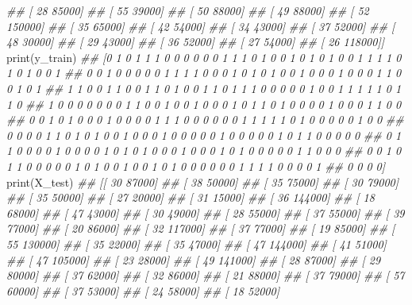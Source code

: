 \documentclass[
]{book}
\newenvironment{Shaded}{\begin{snugshade}}{\end{snugshade}}
\newcommand{\BuiltInTok}[1]{#1}
\newcommand{\CommentTok}[1]{\textcolor[rgb]{0.56,0.35,0.01}{\textit{#1}}}
\newcommand{\NormalTok}[1]{#1}
\theoremstyle{definition}
\theoremstyle{definition}
\theoremstyle{definition}
\theoremstyle{definition}
\theoremstyle{remark}
\begin{document}
\begin{Shaded}
\begin{Highlighting}[]
\CommentTok{\#\#  [    28  85000]}
\CommentTok{\#\#  [    55  39000]}
\CommentTok{\#\#  [    50  88000]}
\CommentTok{\#\#  [    49  88000]}
\CommentTok{\#\#  [    52 150000]}
\CommentTok{\#\#  [    35  65000]}
\CommentTok{\#\#  [    42  54000]}
\CommentTok{\#\#  [    34  43000]}
\CommentTok{\#\#  [    37  52000]}
\CommentTok{\#\#  [    48  30000]}
\CommentTok{\#\#  [    29  43000]}
\CommentTok{\#\#  [    36  52000]}
\CommentTok{\#\#  [    27  54000]}
\CommentTok{\#\#  [    26 118000]]}
\BuiltInTok{print}\NormalTok{(y\_train)}
\CommentTok{\#\# [0 1 0 1 1 1 0 0 0 0 0 0 1 1 1 0 1 0 0 1 0 1 0 1 0 0 1 1 1 1 0 1 0 1 0 0 1}
\CommentTok{\#\#  0 0 1 0 0 0 0 0 1 1 1 1 0 0 0 1 0 1 0 1 0 0 1 0 0 0 1 0 0 0 1 1 0 0 1 0 1}
\CommentTok{\#\#  1 1 0 0 1 1 0 0 1 1 0 1 0 0 1 1 0 1 1 1 0 0 0 0 0 1 0 0 1 1 1 1 1 0 1 1 0}
\CommentTok{\#\#  1 0 0 0 0 0 0 0 1 1 0 0 1 0 0 1 0 0 0 1 0 1 1 0 1 0 0 0 0 1 0 0 0 1 1 0 0}
\CommentTok{\#\#  0 0 1 0 1 0 0 0 1 0 0 0 0 1 1 1 0 0 0 0 0 0 1 1 1 1 1 0 1 0 0 0 0 0 1 0 0}
\CommentTok{\#\#  0 0 0 0 1 1 0 1 0 1 0 0 1 0 0 0 1 0 0 0 0 0 1 0 0 0 0 0 1 0 1 1 0 0 0 0 0}
\CommentTok{\#\#  0 1 1 0 0 0 0 1 0 0 0 0 1 0 1 0 1 0 0 0 1 0 0 0 1 0 1 0 0 0 0 0 1 1 0 0 0}
\CommentTok{\#\#  0 0 1 0 1 1 0 0 0 0 0 1 0 1 0 0 1 0 0 1 0 1 0 0 0 0 0 0 1 1 1 1 0 0 0 0 1}
\CommentTok{\#\#  0 0 0 0]}
\BuiltInTok{print}\NormalTok{(X\_test)}
\CommentTok{\#\# [[    30  87000]}
\CommentTok{\#\#  [    38  50000]}
\CommentTok{\#\#  [    35  75000]}
\CommentTok{\#\#  [    30  79000]}
\CommentTok{\#\#  [    35  50000]}
\CommentTok{\#\#  [    27  20000]}
\CommentTok{\#\#  [    31  15000]}
\CommentTok{\#\#  [    36 144000]}
\CommentTok{\#\#  [    18  68000]}
\CommentTok{\#\#  [    47  43000]}
\CommentTok{\#\#  [    30  49000]}
\CommentTok{\#\#  [    28  55000]}
\CommentTok{\#\#  [    37  55000]}
\CommentTok{\#\#  [    39  77000]}
\CommentTok{\#\#  [    20  86000]}
\CommentTok{\#\#  [    32 117000]}
\CommentTok{\#\#  [    37  77000]}
\CommentTok{\#\#  [    19  85000]}
\CommentTok{\#\#  [    55 130000]}
\CommentTok{\#\#  [    35  22000]}
\CommentTok{\#\#  [    35  47000]}
\CommentTok{\#\#  [    47 144000]}
\CommentTok{\#\#  [    41  51000]}
\CommentTok{\#\#  [    47 105000]}
\CommentTok{\#\#  [    23  28000]}
\CommentTok{\#\#  [    49 141000]}
\CommentTok{\#\#  [    28  87000]}
\CommentTok{\#\#  [    29  80000]}
\CommentTok{\#\#  [    37  62000]}
\CommentTok{\#\#  [    32  86000]}
\CommentTok{\#\#  [    21  88000]}
\CommentTok{\#\#  [    37  79000]}
\CommentTok{\#\#  [    57  60000]}
\CommentTok{\#\#  [    37  53000]}
\CommentTok{\#\#  [    24  58000]}
\CommentTok{\#\#  [    18  52000]}

\end{Highlighting}
\end{Shaded}
\end{document}
